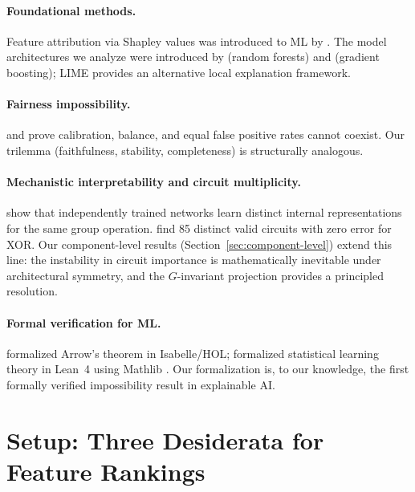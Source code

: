 \documentclass{jmlr}
\begin{document}
\paragraph{Foundational methods.}
Feature attribution via Shapley values \citep{shapley1953value} was introduced to ML by \citet{lundberg2017unified}.
The model architectures we analyze were introduced by \citet{breiman2001random} (random forests) and \citet{friedman2001greedy} (gradient boosting); LIME \citep{ribeiro2016should} provides an alternative local explanation framework.

\paragraph{Fairness impossibility.}
\citet{chouldechova2017fair} and \citet{kleinberg2017inherent} prove calibration, balance, and equal false positive rates cannot coexist.
Our trilemma (faithfulness, stability, completeness) is structurally analogous.

\paragraph{Mechanistic interpretability and circuit multiplicity.}
\citet{chughtai2023toy} show that independently trained networks learn distinct internal representations for the same group operation. \citet{meloux2025circuits} find 85 distinct valid circuits with zero error for XOR. Our component-level results (Section~\ref{sec:component-level}) extend this line: the instability in circuit importance is mathematically inevitable under architectural symmetry, and the $G$-invariant projection provides a principled resolution.

\paragraph{Formal verification for ML.}
\citet{nipkow2009social} formalized Arrow's theorem in Isabelle/HOL; \citet{zhang2026statistical} formalized statistical learning theory in Lean~4 \citep{demoura2021lean4} using Mathlib \citep{mathlib2020}. Our formalization is, to our knowledge, the first formally verified impossibility result in explainable AI.


\section{Setup: Three Desiderata for Feature Rankings}
\label{sec:setup}
\end{document}
